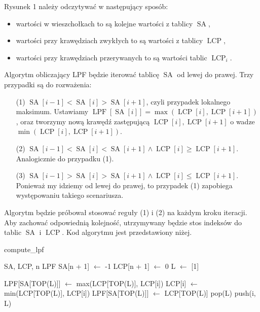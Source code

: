 \documentclass[a4paper,12pt]{article}
\theoremstyle{definition}
\DeclareMathOperator{\SA}{SA}
\DeclareMathOperator{\LCP}{LCP}
\DeclareMathOperator{\LPF}{LPF}
\begin{document}
Rysunek 1 należy odczytywać w następujący sposób:
\begin{itemize}
\item wartości w wieszchołkach to są kolejne wartości z tablicy $\SA$,
\item wartości przy krawędziach zwykłych to są wartości z tablicy $\LCP$,
\item wartości przy krawędziach przerywanych to są wartości tablic $\LCP_{i}$.
\end{itemize}

Algorytm obliczający LPF będzie iterować tablicę $\SA$ od lewej do prawej.
Trzy przypadki są do rozważenia:

\begin{enumerate}
\item[(1)] $\SA[i - 1] < \SA[i] > \SA[i + 1]$, czyli przypadek lokalnego maksimum.
  Ustawiamy $\LPF[\SA[i]] = \max(\LCP[i], \LCP[i + 1])$, oraz
  tworzymy nową krawędź zastępującą $\LCP[i], \LCP[i + 1]$ o wadze $\min(\LCP[i], \LCP[i + 1])$.
\item[(2)] $\SA[i - 1] < \SA[i] < \SA[i + 1] \land \LCP[i] \geq \LCP[i + 1]$.
  Analogicznie do przypadku (1).
\item[(3)] $\SA[i - 1] > \SA[i] > \SA[i + 1] \land \LCP[i] \leq \LCP[i + 1]$.
  Ponieważ my idziemy od lewej do prawej, to przypadek (1) zapobiega występowaniu takiego scenariusza.
\end{enumerate}

Algorytm będzie próbował stosować reguły (1) i (2) na każdym kroku iteracji.
Aby zachować odpowiednią kolejność, utrzymywany będzie stos indeksów do tablic $\SA$ i $\LCP$.
Kod algorytmu jest przedstawiony niżej.

\begin{algorithm}
\caption{compute\_lpf}
\begin{algorithmic}
\REQUIRE SA, LCP, n
\ENSURE LPF
\STATE SA[n + 1] $\gets$ -1
\STATE LCP[n + 1] $\gets$ 0
\STATE L $\gets$ [1]

\STATE LPF[SA[TOP(L)]] $\gets$ max(LCP[TOP(L)], LCP[i])
\STATE LCP[i] $\gets$ min(LCP[TOP(L)], LCP[i])
\ELSE
\STATE LPF[SA[TOP(L)]] $\gets$ LCP[TOP(L)]
\ENDIF
\STATE pop(L)
\ENDWHILE
{}
\STATE push(i, L)
\ENDIF
\ENDFOR
\end{algorithmic}
\end{algorithm}
\end{document}
